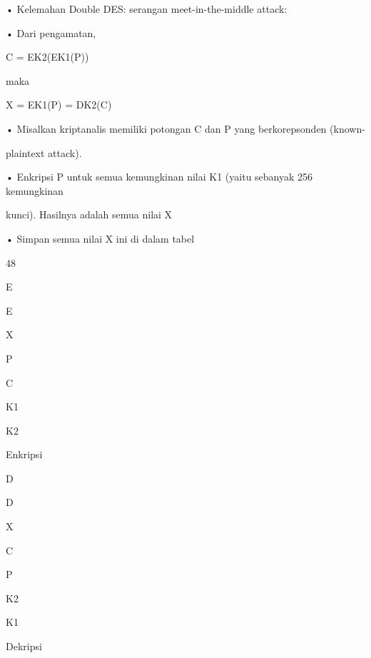 \documentclass{article}
\begin{document}

• Kelemahan Double DES: serangan meet-in-the-middle attack:

• Dari pengamatan, 


C = EK2(EK1(P))

   maka 


X = EK1(P) = DK2(C)


• Misalkan kriptanalis memiliki potongan C dan P yang berkorepsonden (known-

plaintext attack).

• Enkripsi P untuk semua kemungkinan nilai K1 (yaitu sebanyak 256 kemungkinan 

kunci). Hasilnya adalah semua nilai X  

• Simpan semua nilai X ini di dalam tabel 

48

E

E

X

P

C

K1

K2

Enkripsi

D

D

X

C

P

K2

K1

Dekripsi
\end{document}
